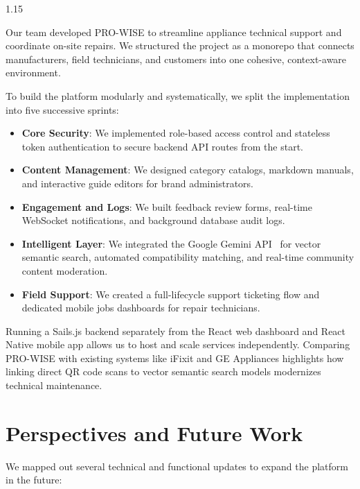 \documentclass[12pt,a4paper]{report}
\begin{document}
\begin{spacing}{1.15}
\setlength{\parskip}{2pt}

Our team developed PRO-WISE to streamline appliance technical support and coordinate on-site repairs. We structured the project as a monorepo that connects manufacturers, field technicians, and customers into one cohesive, context-aware environment.

To build the platform modularly and systematically, we split the implementation into five successive sprints:
\begin{itemize}
    \item \textbf{Core Security}: We implemented role-based access control and stateless token authentication to secure backend API routes from the start.
    \item \textbf{Content Management}: We designed category catalogs, markdown manuals, and interactive guide editors for brand administrators.
    \item \textbf{Engagement and Logs}: We built feedback review forms, real-time WebSocket notifications, and background database audit logs.
    \item \textbf{Intelligent Layer}: We integrated the Google Gemini API~\cite{gemini} for vector semantic search, automated compatibility matching, and real-time community content moderation.
    \item \textbf{Field Support}: We created a full-lifecycle support ticketing flow and dedicated mobile jobs dashboards for repair technicians.
\end{itemize}

Running a Sails.js backend separately from the React web dashboard and React Native mobile app allows us to host and scale services independently. Comparing PRO-WISE with existing systems like iFixit and GE Appliances highlights how linking direct QR code scans to vector semantic search models modernizes technical maintenance.

\section*{Perspectives and Future Work}

We mapped out several technical and functional updates to expand the platform in the future:


\end{spacing}
\end{document}
